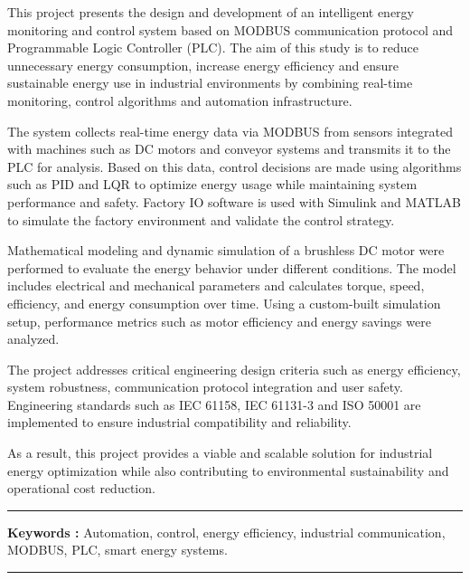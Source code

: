 
This project presents the design and development of an intelligent energy monitoring and control system based on MODBUS communication protocol and Programmable Logic Controller (PLC). The aim of this study is to reduce unnecessary energy consumption, increase energy efficiency and ensure sustainable energy use in industrial environments by combining real-time monitoring, control algorithms and automation infrastructure.\vspace{3mm}

\medskip

The system collects real-time energy data via MODBUS from sensors integrated with machines such as DC motors and conveyor systems and transmits it to the PLC for analysis. Based on this data, control decisions are made using algorithms such as PID and LQR to optimize energy usage while maintaining system performance and safety. Factory IO software is used with Simulink and MATLAB to simulate the factory environment and validate the control strategy.

\medskip

Mathematical modeling and dynamic simulation of a brushless DC motor were performed to evaluate the energy behavior under different conditions. The model includes electrical and mechanical parameters and calculates torque, speed, efficiency, and energy consumption over time. Using a custom-built simulation setup, performance metrics such as motor efficiency and energy savings were analyzed.

\medskip

The project addresses critical engineering design criteria such as energy efficiency, system robustness, communication protocol integration and user safety. Engineering standards such as IEC 61158, IEC 61131-3 and ISO 50001 are implemented to ensure industrial compatibility and reliability.

\medskip

As a result, this project provides a viable and scalable solution for industrial energy optimization while also contributing to environmental sustainability and operational cost reduction.

\noindent\rule[2pt]{\textwidth}{0.5pt}

{\textbf{Keywords :}}
Automation, control, energy efficiency, industrial communication,  MODBUS, PLC, smart energy systems.\\
\noindent\rule[2pt]{\textwidth}{0.5pt}
